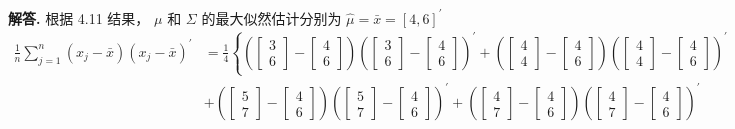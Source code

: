 \documentclass[12pt, a4paper, oneside]{ctexart}
\newenvironment{solution}{\par\noindent\textbf{解答. }}{\par}
\begin{document}
\begin{solution}
    根据 4.11 结果， $\mu$ 和 $\Sigma$ 的最大似然估计分别为 $\hat{\mu}=\bar{x}=[4,6]^{\prime}$
    \begin{align*}
        \frac{1}{n}\sum_{j=1}^{n}\left(x_{j}-\bar{x}\right)\left(x_{j}-\bar{x}\right)^{\prime} &= \frac{1}{4} 
        \left\{
            \left(\begin{bmatrix}3\\6\end{bmatrix}-\begin{bmatrix}4\\6\end{bmatrix}\right)\left(\begin{bmatrix}3\\6\end{bmatrix}-\begin{bmatrix}4\\6\end{bmatrix}\right)^{\prime}+
            \left(\begin{bmatrix}4\\4\end{bmatrix}-\begin{bmatrix}4\\6\end{bmatrix}\right)\left(\begin{bmatrix}4\\4\end{bmatrix}-\begin{bmatrix}4\\6\end{bmatrix}\right)^{\prime}\right.\\
        &\left.+\left(\begin{bmatrix}5\\7\end{bmatrix}-\begin{bmatrix}4\\6\end{bmatrix}\right)\left(\begin{bmatrix}5\\7\end{bmatrix}-\begin{bmatrix}4\\6\end{bmatrix}\right)^{\prime}+
            \left(\begin{bmatrix}4\\7\end{bmatrix}-\begin{bmatrix}4\\6\end{bmatrix}\right)\left(\begin{bmatrix}4\\7\end{bmatrix}-\begin{bmatrix}4\\6\end{bmatrix}\right)^{\prime}

\end{align*}
\end{solution}
\end{document}
